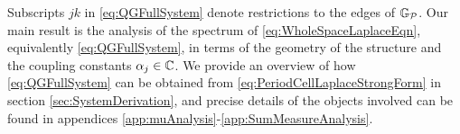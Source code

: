 Subscripts $jk$ in \eqref{eq:QGFullSystem} denote restrictions to the edges of $\mathbb{G}_{\mathcal{P}}$.
Our main result is the analysis of the spectrum of \eqref{eq:WholeSpaceLaplaceEqn}, equivalently \eqref{eq:QGFullSystem}, in terms of the geometry of the structure and the coupling constants $\alpha_j\in\mathbb{C}$.
We provide an overview of how \eqref{eq:QGFullSystem} can be obtained from \eqref{eq:PeriodCellLaplaceStrongForm} in section \ref{sec:SystemDerivation}, and precise details of the objects involved can be found in appendices \ref{app:muAnalysis}-\ref{app:SumMeasureAnalysis}.
